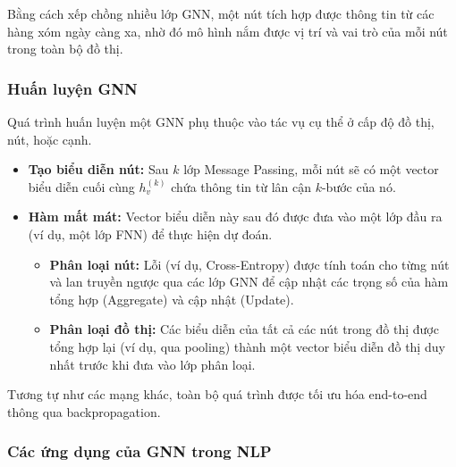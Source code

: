 \begin{center}
    \label{fig:gnn_message_passing}
\end{center}

Bằng cách xếp chồng nhiều lớp GNN, một nút tích hợp được thông tin từ các hàng xóm ngày càng xa, nhờ đó mô hình nắm được vị trí và vai trò của mỗi nút trong toàn bộ đồ thị.

\subsubsection{Huấn luyện GNN}
Quá trình huấn luyện một GNN phụ thuộc vào tác vụ cụ thể ở cấp độ đồ thị, nút, hoặc cạnh.
\begin{itemize}
    \item \textbf{Tạo biểu diễn nút:} Sau $k$ lớp Message Passing, mỗi nút sẽ có một vector biểu diễn cuối cùng $h_v^{(k)}$ chứa thông tin từ lân cận $k$-bước của nó.
    \item \textbf{Hàm mất mát:} Vector biểu diễn này sau đó được đưa vào một lớp đầu ra (ví dụ, một lớp FNN) để thực hiện dự đoán.
        \begin{itemize}
            \item \textbf{Phân loại nút:} Lỗi (ví dụ, Cross-Entropy) được tính toán cho từng nút và lan truyền ngược qua các lớp GNN để cập nhật các trọng số của hàm tổng hợp (Aggregate) và cập nhật (Update).
            \item \textbf{Phân loại đồ thị:} Các biểu diễn của tất cả các nút trong đồ thị được tổng hợp lại (ví dụ, qua pooling) thành một vector biểu diễn đồ thị duy nhất trước khi đưa vào lớp phân loại.
        \end{itemize}
\end{itemize}
Tương tự như các mạng khác, toàn bộ quá trình được tối ưu hóa end-to-end thông qua backpropagation.

\subsubsection{Các ứng dụng của GNN trong NLP}
\label{ssec:gnn_applications}

